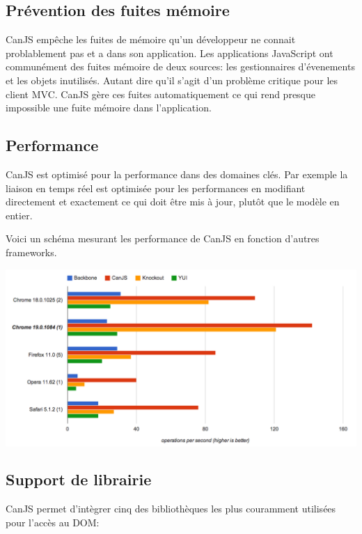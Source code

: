 \subsection{Prévention des fuites mémoire}

CanJS empêche les fuites de mémoire qu’un développeur ne connait problablement pas et a dans son application. Les applications JavaScript ont communément des fuites mémoire de deux sources: les gestionnaires d’évenements et les objets inutilisés.
Autant dire qu’il s’agit d’un problème critique pour les client MVC. CanJS gère ces fuites automatiquement ce qui rend presque impossible une fuite mémoire dans l’application.

\subsection{Performance}

CanJS est optimisé pour la performance dans des domaines clés.
Par exemple la liaison en temps réel est optimisée pour les performances en modifiant directement et exactement ce qui doit être mis à jour, plutôt que le modèle en entier.

Voici un schéma mesurant les performance de CanJS en fonction d’autres frameworks.


\begin{center}
\includegraphics[scale=0.4]{img/performance_livebind.png}
\label{Graphique performance CanJS}
\end{center}

\subsection{Support de librairie}

CanJS permet d'intègrer cinq des bibliothèques les plus couramment utilisées pour l’accès au DOM:

